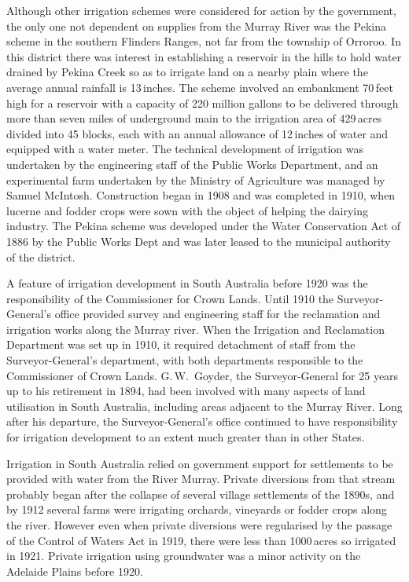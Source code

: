 Although other irrigation schemes were considered for action by the
government, the only one not dependent on supplies from the Murray
River was the Pekina scheme  in the
southern Flinders Ranges, not far from the township of
Orroroo.  In this district there was interest in
establishing a reservoir in the hills to hold water drained by Pekina
Creek  so as to irrigate land on a nearby plain
where the average annual rainfall is 13\,inches.  The scheme involved
an embankment 70\,feet high for a reservoir with a capacity of 220
million gallons to be delivered through more than seven miles of
underground main to the irrigation area of 429\,acres divided into 45
blocks, each with an annual allowance of 12\,inches of water and
equipped with a water meter.  The technical development of irrigation
was undertaken by the engineering staff of the Public Works
Department, and an experimental farm undertaken by the Ministry of
Agriculture was managed by Samuel McIntosh.  Construction began in
1908 and was completed in 1910, when lucerne and fodder crops were
sown with the object of helping the dairying industry.  The Pekina
scheme was developed under the Water Conservation Act of 1886 by the
Public Works Dept and was later leased to the municipal authority of
the district.

A feature of irrigation development in South Australia before 1920 was
the responsibility of the Commissioner for Crown Lands.  Until 1910
the Surveyor-General's office provided survey and engineering staff
for the reclamation and irrigation works along the Murray river.  When
the Irrigation and Reclamation Department was set up in 1910, it
required detachment of staff from the Surveyor-General's department,
with both departments responsible to the Commissioner of Crown Lands.
G.\,W.~Goyder,  the Surveyor-General for 25
years up to his retirement in 1894, had been involved with many
aspects of land utilisation in South Australia, including areas
adjacent to the Murray River.  Long after his departure, the
Surveyor-General's office continued to have responsibility for
irrigation development to an extent much greater than in other States.

Irrigation in South Australia relied on government support for
settlements to be provided with water from the River Murray.  Private
diversions from that stream probably began after the collapse of
several village settlements of the 1890s, and by 1912 several farms
were irrigating orchards, vineyards or fodder crops along the river.
However even when private diversions were regularised by the passage
of the Control of Waters Act in 1919, there were less than 1000\,acres so
irrigated in 1921. Private irrigation using groundwater was a minor
activity on the Adelaide Plains before 1920.

